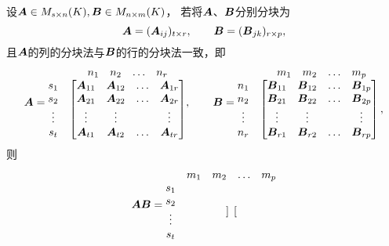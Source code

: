 \begin{enumerate}
	设\(\boldsymbol{A}\in M_{s \times n}(K),
	\boldsymbol{B}\in M_{n \times m}(K)\)，
	若将\(\boldsymbol{A}\)、\(\boldsymbol{B}\)分别分块为\[
		\boldsymbol{A}=(\boldsymbol{A}_{ij})_{t \times r}, \qquad
		\boldsymbol{B}=(\boldsymbol{B}_{jk})_{r \times p},
	\]
	且\(\boldsymbol{A}\)的列的分块法与\(\boldsymbol{B}\)的行的分块法一致，即\[
		\boldsymbol{A} = \begin{matrix}
			& \begin{matrix} n_1 & n_2 & \dots & n_r \end{matrix} \\
			\begin{matrix} s_1 \\ s_2 \\ \vdots \\ s_t \end{matrix} & \begin{bmatrix}
			\boldsymbol{A}_{11} & \boldsymbol{A}_{12} & \dots & \boldsymbol{A}_{1r} \\
			\boldsymbol{A}_{21} & \boldsymbol{A}_{22} & \dots & \boldsymbol{A}_{2r} \\
			\vdots & \vdots & & \vdots \\
			\boldsymbol{A}_{t1} & \boldsymbol{A}_{t2} & \dots & \boldsymbol{A}_{tr}
			\end{bmatrix}
		\end{matrix},
		\qquad
		\boldsymbol{B} = \begin{matrix}
			& \begin{matrix} m_1 & m_2 & \dots & m_p \end{matrix} \\
			\begin{matrix} n_1 \\ n_2 \\ \vdots \\ n_r \end{matrix} & \begin{bmatrix}
			\boldsymbol{B}_{11} & \boldsymbol{B}_{12} & \dots & \boldsymbol{B}_{1p} \\
			\boldsymbol{B}_{21} & \boldsymbol{B}_{22} & \dots & \boldsymbol{B}_{2p} \\
			\vdots & \vdots & & \vdots \\
			\boldsymbol{B}_{r1} & \boldsymbol{B}_{r2} & \dots & \boldsymbol{B}_{rp}
			\end{bmatrix},
		\end{matrix}
	\]
	则\[
		\boldsymbol{A}\boldsymbol{B} = \begin{matrix}
			& \begin{matrix} m_1 & m_2 & \dots & m_p \end{matrix} \\
			\begin{matrix} s_1 \\ s_2 \\ \vdots \\ s_t \end{matrix} & \begin{bmatrix}

\end{bmatrix}
\end{matrix}\]
\end{enumerate}

